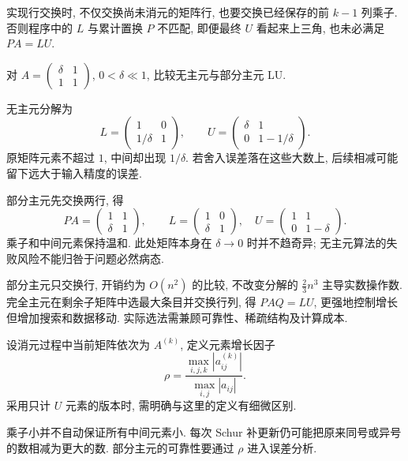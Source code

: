 \begin{remark}
实现行交换时, 不仅交换尚未消元的矩阵行, 也要交换已经保存的前 $k-1$ 列乘子. 否则程序中的 $L$ 与累计置换 $P$ 不匹配, 即便最终 $U$ 看起来上三角, 也未必满足 $PA=LU$.
\end{remark}
\begin{example}
对 $A=\begin{pmatrix}\delta&1\\1&1\end{pmatrix}$, $0<\delta\ll1$, 比较无主元与部分主元 LU.
\end{example}
\begin{solution}
无主元分解为
\[
L=\begin{pmatrix}1&0\\1/\delta&1\end{pmatrix},\qquad
U=\begin{pmatrix}\delta&1\\0&1-1/\delta\end{pmatrix}.
\]
原矩阵元素不超过 $1$, 中间却出现 $1/\delta$. 若舍入误差落在这些大数上, 后续相减可能留下远大于输入精度的误差.

部分主元先交换两行, 得
\[
PA=\begin{pmatrix}1&1\\\delta&1\end{pmatrix},\qquad
L=\begin{pmatrix}1&0\\\delta&1\end{pmatrix},\quad
U=\begin{pmatrix}1&1\\0&1-\delta\end{pmatrix}.
\]
乘子和中间元素保持温和. 此处矩阵本身在 $\delta\to0$ 时并不趋奇异; 无主元算法的失败风险不能归咎于问题必然病态.
\end{solution}
部分主元只交换行, 开销约为 $O(n^2)$ 的比较, 不改变分解的 $\tfrac23n^3$ 主导实数操作数. 完全主元在剩余子矩阵中选最大条目并交换行列, 得 $PAQ=LU$, 更强地控制增长但增加搜索和数据移动. 实际选法需兼顾可靠性、稀疏结构及计算成本.

\begin{definition}
设消元过程中当前矩阵依次为 $A^{(k)}$, 定义元素增长因子
\[
\rho=\frac{\max_{i,j,k}|a_{ij}^{(k)}|}{\max_{i,j}|a_{ij}|}.
\]
采用只计 $U$ 元素的版本时, 需明确与这里的定义有细微区别.
\end{definition}
乘子小并不自动保证所有中间元素小. 每次 Schur 补更新仍可能把原来同号或异号的数相减为更大的数. 部分主元的可靠性要通过 $\rho$ 进入误差分析.

